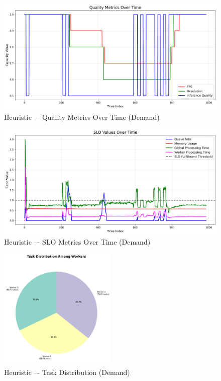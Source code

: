 


\begin{figure}[h]
    \centering
    \includegraphics[width=\textwidth]{img/results/variable_computational_demand/heuristic_quality_metrics.png}
    \caption{Heuristic –- Quality Metrics Over Time (Demand)}
\end{figure}
\begin{figure}[h]
    \centering
    \includegraphics[width=\textwidth]{img/results/variable_computational_demand/heuristic_slo_values.png}
    \caption{Heuristic –- SLO Metrics Over Time (Demand)}
\end{figure}
\begin{figure}[h]
    \centering
    \includegraphics[width=0.5\textwidth]{img/results/variable_computational_demand/heuristic_task_distribution_pie.png}
    \caption{Heuristic –- Task Distribution (Demand)}
\end{figure}

